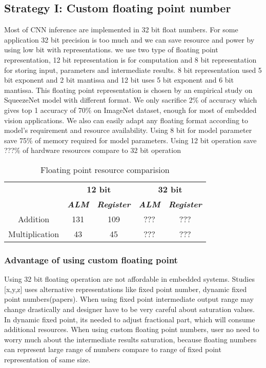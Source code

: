 \documentclass[conference]{IEEEtran}
\begin{document}
\subsection{Strategy I: Custom floating point number
}\label{AA}
Most of CNN inference are implemented in 32 bit float numbers. For some application 32 bit precision is too much and we can save resource and power by using low bit with representations. we use two type of floating point representation, 12 bit representation is for computation and 8 bit representation for storing input, parameters and intermediate results. 8 bit representation used 5 bit exponent and 2 bit mantissa and 12 bit uses 5 bit exponent and 6 bit mantissa. This floating point representation is chosen by an empirical study on SqueezeNet model with different format. We only sacrifice 2\% of accuracy which gives top 1 accuracy of 70\% on ImageNet dataset, enough for most of embedded vision applications. We also can easily adapt any floating format according to model’s requirement and resource availability. 
Using 8 bit for model parameter save 75\% of memory required for model parameters. Using 12 bit operation save ???\% of hardware resources compare to 32 bit operation


\begin{table}[htbp]
\caption{Floating point resource comparision}
\begin{center}
\begin{tabular}{|c|c|c|c|c|}
\hline
&\multicolumn{2}{|c|}{\textbf{12 bit}} &\multicolumn{2}{|c|}{\textbf{32 bit}}\\
\cline{2-5} 
 & \textbf{\textit{ALM}} & \textbf{\textit{Register}}& \textbf{\textit{ALM}}& \textbf{\textit{Register}}\\
\hline
Addition& 131 & 109 & ??? & ???  \\
\hline
Multiplication& 43 & 45 & ??? & ???  \\
\hline
\end{tabular}
\label{tab1}
\end{center}
\end{table}



\subsubsection{Advantage of using custom floating point
}
Using 32 bit floating operation are not affordable in embedded systems. Studies [x,y,z] uses alternative representations like fixed point number, dynamic fixed point numbers(papers). When using fixed point intermediate output range may change drastically and designer have to be very careful about saturation values. In dynamic fixed point, its needed to adjust fractional part, which will consume additional resources. When using custom floating point numbers, user no need to worry much about the intermediate results saturation, because floating numbers can represent large range of numbers compare to range of fixed point representation of same size. 
\end{document}
